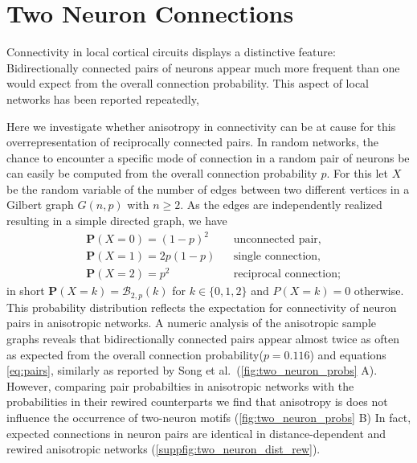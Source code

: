 \newpage

\section{Two Neuron Connections}

Connectivity in local cortical circuits displays a distinctive
feature: Bidirectionally connected pairs of neurons appear much more
frequent than one would expect from the overall connection
probability. This aspect of local networks has been reported
repeatedly,






Here we investigate whether anisotropy in connectivity can be at cause
for this overrepresentation of reciprocally connected pairs. In random
networks, the chance to encounter a specific mode of connection in
a random pair of neurons be can easily be computed from the overall
connection probability $p$. For this let $X$ be the random variable of the
number of edges between two different vertices in a Gilbert graph
$G(n,p)$ with $n \ge 2$. As the edges are independently realized
resulting in a simple directed graph, we have
\begin{equation}
  \label{eq:pairs}
  \begin{aligned}%
    & \mathbf{P}(X=0) = (1-p)^2   &&\text{unconnected pair,}  \\
    & \mathbf{P}(X=1)= 2p(1-p)    &&\text{single connection,}\\
    & \mathbf{P}(X=2) = p^2       &&\text{reciprocal connection};
  \end{aligned}%
\end{equation}
in short $\mathbf{P}(X=k) = \mathcal{B}_{2,p}(k)$ for $k \in
\{0,1,2\}$ and $P(X=k) = 0$ otherwise. This probability distribution
reflects the expectation for connectivity of neuron pairs in
anisotropic networks. A numeric analysis of the anisotropic sample
graphs reveals that bidirectionally connected pairs appear almost
twice as often as expected from the overall connection
probability($p=0.116$) and equations \ref{eq:pairs}, similarly as
reported by Song et al.~(\autoref{fig:two_neuron_probs}
A). However, comparing pair probabilties in anisotropic networks with
the probabilities in their rewired counterparts we find that
anisotropy is does not influence the occurrence of two-neuron motifs
(\autoref{fig:two_neuron_probs} B) In fact, expected connections in
neuron pairs are identical in distance-dependent and rewired
anisotropic networks (\autoref{suppfig:two_neuron_dist_rew}).

